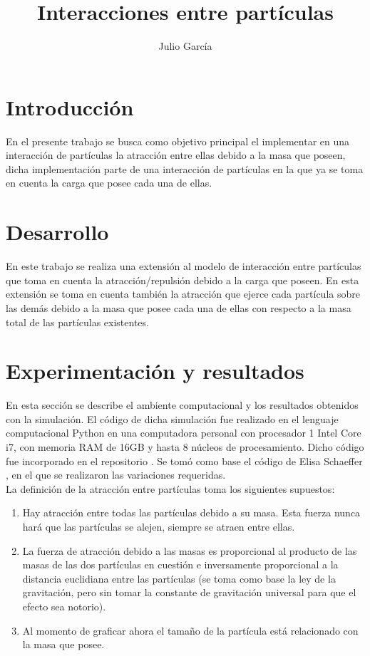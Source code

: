 \documentclass{article}
\title {Interacciones entre partículas}
\author{Julio Garc\'ia}
\begin{document}
	\renewcommand{\listtablename}{Índice de tablas}
	\renewcommand{\tablename}{Cuadro}
	\maketitle
	
	\section{Introducción}
	En el presente trabajo se busca como objetivo principal el implementar en una interacción de partículas la atracción entre ellas debido a la masa que poseen, dicha implementación parte de una interacción de partículas en la que ya se toma en cuenta la carga que posee cada una de ellas.  
	
	\section{Desarrollo}
	En este trabajo se realiza una extensión al modelo de interacción entre partículas que toma en cuenta la atracción/repulsión debido a la carga que poseen. En esta extensión se toma en cuenta también la atracción que ejerce cada partícula sobre las demás debido a la masa que posee cada una de ellas con respecto a la masa total de las partículas existentes.
	
	\section{Experimentación y resultados}
	En esta sección se describe el ambiente computacional y los resultados obtenidos con la simulación. El código de dicha simulación fue realizado en el lenguaje computacional Python en una computadora personal con procesador 1 Intel Core i7, con memoria RAM de 16GB y hasta 8 núcleos de procesamiento. Dicho código fue incorporado en el repositorio \cite{p_9}.  Se tomó como base el código de Elisa Schaeffer \cite{p9}, en el que se realizaron las variaciones requeridas.\\
	La definición de la atracción entre partículas toma los siguientes supuestos:
	\begin{enumerate}
	\item Hay atracción entre todas las partículas debido a su masa. Esta fuerza nunca hará que las partículas se alejen, siempre se atraen entre ellas.
	\item La fuerza de atracción debido a las masas es proporcional al producto de las masas de las dos partículas en cuestión e inversamente proporcional a la distancia euclidiana entre las partículas (se toma como base la ley de la gravitación, pero sin tomar la constante de gravitación universal para que el efecto sea notorio).
	\item Al momento de graficar ahora el tamaño de la partícula está relacionado con la masa que posee.
	\end{enumerate}
	
\end{document}
